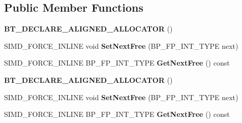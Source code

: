 \subsection*{Public Member Functions}
\begin{DoxyCompactItemize}
\item 
\mbox{\label{classbtAxisSweep3Internal_1_1Handle_ac450e928bd2366f3ef261614603e7861}} 
{\bfseries B\+T\+\_\+\+D\+E\+C\+L\+A\+R\+E\+\_\+\+A\+L\+I\+G\+N\+E\+D\+\_\+\+A\+L\+L\+O\+C\+A\+T\+OR} ()
\item 
\mbox{\label{classbtAxisSweep3Internal_1_1Handle_a6e6eb1bf1e98c16b01bf71f5f479c7ff}} 
S\+I\+M\+D\+\_\+\+F\+O\+R\+C\+E\+\_\+\+I\+N\+L\+I\+NE void {\bfseries Set\+Next\+Free} (B\+P\+\_\+\+F\+P\+\_\+\+I\+N\+T\+\_\+\+T\+Y\+PE next)
\item 
\mbox{\label{classbtAxisSweep3Internal_1_1Handle_a9cbb76dd696ca9d8d3bb0c8ca4a8f30e}} 
S\+I\+M\+D\+\_\+\+F\+O\+R\+C\+E\+\_\+\+I\+N\+L\+I\+NE B\+P\+\_\+\+F\+P\+\_\+\+I\+N\+T\+\_\+\+T\+Y\+PE {\bfseries Get\+Next\+Free} () const
\item 
\mbox{\label{classbtAxisSweep3Internal_1_1Handle_ac450e928bd2366f3ef261614603e7861}} 
{\bfseries B\+T\+\_\+\+D\+E\+C\+L\+A\+R\+E\+\_\+\+A\+L\+I\+G\+N\+E\+D\+\_\+\+A\+L\+L\+O\+C\+A\+T\+OR} ()
\item 
\mbox{\label{classbtAxisSweep3Internal_1_1Handle_a6e6eb1bf1e98c16b01bf71f5f479c7ff}} 
S\+I\+M\+D\+\_\+\+F\+O\+R\+C\+E\+\_\+\+I\+N\+L\+I\+NE void {\bfseries Set\+Next\+Free} (B\+P\+\_\+\+F\+P\+\_\+\+I\+N\+T\+\_\+\+T\+Y\+PE next)
\item 
\mbox{\label{classbtAxisSweep3Internal_1_1Handle_a9cbb76dd696ca9d8d3bb0c8ca4a8f30e}} 
S\+I\+M\+D\+\_\+\+F\+O\+R\+C\+E\+\_\+\+I\+N\+L\+I\+NE B\+P\+\_\+\+F\+P\+\_\+\+I\+N\+T\+\_\+\+T\+Y\+PE {\bfseries Get\+Next\+Free} () const
\end{DoxyCompactItemize}
